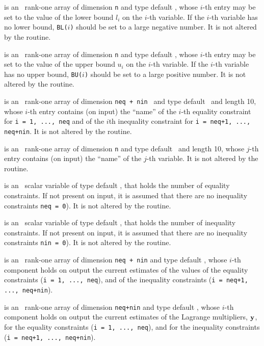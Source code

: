 \documentclass{galahad}
\begin{document}
\begin{description}
 is an \optional\ rank-one array of dimension {\tt n} and type
 default \realdp, whose $i$-th entry may be set
to the value of the lower bound $l_i$ on the $i$-th variable.
If the $i$-th variable has no lower bound, {\tt BL($i$)} should be set to
a large negative number. It is not altered by the routine.

 is an \optional\ rank-one array of dimension {\tt n} and type
default \realdp, whose $i$-th entry may be set
to the value of the upper bound $u_i$ on the $i$-th variable.
If the $i$-th variable has no upper bound, {\tt BU($i$)} should be set to
a large positive number.  It is not altered by the routine.

 is an \optional\  rank-one array of dimension {\tt neq + nin }
and type default \character\ and length 10, whose $i$-th entry contains (on
input) the ``name'' of the $i$-th equality constraint  for
{\tt i = 1, ..., neq} and of the $i$th inequality constraint for
{\tt i = neq+1, ..., neq+nin}.  It is not altered by the routine.

 is an \optional\ rank-one array of dimension {\tt n} and type
default \character\ and length 10, whose $j$-th entry contains (on input) the
``name'' of the $j$-th variable.  It is not altered by the routine.

 is an \optional\ scalar variable of type default \integer, that holds
the number of equality constraints. If not present on input, it is assumed
that there are no inequality constraints {\tt neq = 0}). It is not altered by
the routine.

 is an \optional\ scalar variable of type default \integer, that holds
the number of inequality constraints. If not present on input, it is assumed
that there are no inequality constraints {\tt nin = 0}). It is not altered by
the routine.

 is an \optional\ rank-one array of dimension {\tt neq + nin} and type
default \realdp, whose $i$-th component holds on output the current
estimates of the values of the equality constraints ({\tt i = 1, ..., neq}),
and of the inequality constraints  ({\tt i = neq+1, ..., neq+nin}).

 is an \optional\ rank-one array of dimension {\tt neq+nin} and type
default \realdp, whose $i$-th component holds on output the current
estimates of the Lagrange multipliers, ${\mathbf{y}}$, for the equality constraints
({\tt i = 1, ..., neq}), and for the inequality constraints  ({\tt i = neq+1,
  ..., neq+nin}).


\end{description}
\end{document}
